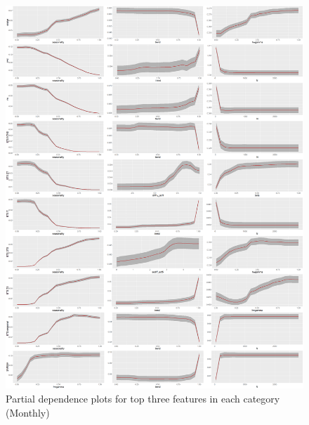 \documentclass[11pt,a4paper,]{article}
\theoremstyle{definition}
\theoremstyle{definition}
\theoremstyle{definition}
\theoremstyle{remark}
\begin{document}
\clearpage

\begin{figure}
\centering
\includegraphics{figures/pdpmonthly1-1.png}
\caption{\label{fig:pdpmonthly1}Partial dependence plots for top three
features in each category (Monthly)}
\end{figure}

\newpage
\end{document}
